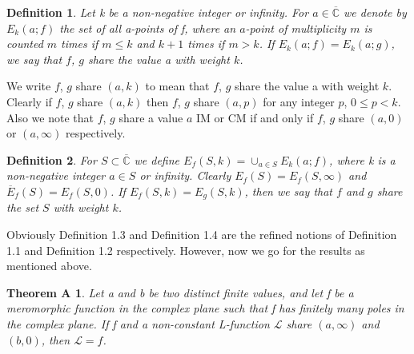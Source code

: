 \documentclass[a4paper,draft]{amsproc}
\theoremstyle{plain}
\newtheorem*{theoA}{Theorem A}
\newtheorem{defi}{Definition}[section]
\theoremstyle{definition}
\theoremstyle{remark}
\newcommand{\ol}{\overline}
\numberwithin{equation}{section}
\renewcommand{\leq}{\leqslant}\renewcommand{\geq}{\geqslant}
\begin{document}
	\begin{defi}\cite{lahiriNagoya, Lahiri CVEE}
		Let k be a non-negative integer or infinity. For $a\in\overline{\mathbb{C}}$  we
		denote by $E_k(a; f)$ the set of all a-points of f, where an $a$-point of multiplicity $m$ is counted
		$m$ times if $m\leq k$ and $k + 1$ times if $m > k$. If $E_k(a; f) = E_k(a; g)$, we say that $f$, $g$ share
		the value a with weight $k$.
	\end{defi}
	We write $f$, $g$ share $(a,k)$ to mean that $f$, $g$ share the value a with weight $k$. Clearly if
	$f$, $g$ share $(a,k)$ then $f$, $g$ share $(a,p)$ for any integer $p$, $0\leq p < k$. Also we note that $f$, $g$
	share a value $a$ IM or CM if and only if $f$, $g$ share $(a,0)$ or $(a,\infty)$ respectively.
	\begin{defi}\cite{lahiriNagoya}
		For $S\subset\mathbb{\ol C}$ we define $E_f(S,k)=\cup_{a\in S}E_k(a;f)$, where k is a non-negative integer $a\in S$ or infinity. Clearly $E_f(S)=E_f(S,\infty)$ and $\overline{E}_f(S)=E_f(S,0)$. If $E_f(S,k)=E_g(S,k)$, then we say that $f$ and $g$ share the set $S$ with weight $k$.
	\end{defi}
	Obviously Definition 1.3 and Definition 1.4 are the refined notions of Definition 1.1 and Definition 1.2 respectively. However, now we go for the results as mentioned above. %
	\begin{theoA}\cite{li2010}
		Let a and b be two distinct
		finite values, and let f be a meromorphic function in
		the complex plane such that f has finitely many poles
		in the complex plane. If f and a non-constant L-function
		$\mathcal{L}$ share $(a,\infty)$ and $(b,0)$, then $\mathcal{L} = f$.
	\end{theoA}
\end{document}
